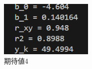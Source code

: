 \documentclass[titlepage,a4paper,12pt]{ltjsreport}
\begin{document}
\begin{enumerate}
    \begin{figure}[h]
        \centering
        \includegraphics[width=0.4\textwidth]{../picture/課題3/kitaichi4.png}
        \caption{期待値4}
        \label{kitaichi4}
    \end{figure}
    
    
     

\end{enumerate}
\end{document}
